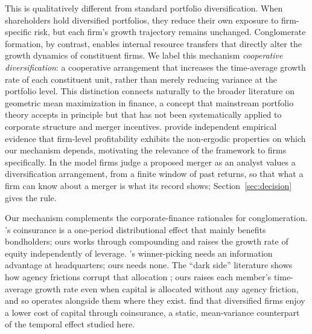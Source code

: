 \documentclass[12pt,a4paper]{article}
\begin{document}
This is qualitatively different from standard portfolio diversification. When shareholders hold diversified portfolios, they reduce their own exposure to firm-specific risk, but each firm's growth trajectory remains unchanged. Conglomerate formation, by contrast, enables internal resource transfers that directly alter the growth dynamics of constituent firms. We label this mechanism \textit{cooperative diversification}: a cooperative arrangement that increases the time-average growth rate of each constituent unit, rather than merely reducing variance at the portfolio level. This distinction connects naturally to the broader literature on geometric mean maximization in finance, a concept that mainstream portfolio theory accepts in principle but that has not been systematically applied to corporate structure and merger incentives. \textcite{mundt2022survival} provide independent empirical evidence that firm-level profitability exhibits the non-ergodic properties on which our mechanism depends, motivating the relevance of the framework to firms specifically. In the model firms judge a proposed merger as an analyst values a diversification arrangement, from a finite window of past returns, so that what a firm can know about a merger is what its record shows; Section~\ref{sec:decision} gives the rule. 

Our mechanism complements the corporate-finance rationales for conglomeration. \textcite{lewellen1971pure}'s coinsurance is a one-period distributional effect that mainly benefits bondholders; ours works through compounding and raises the growth rate of equity independently of leverage. \textcite{stein1997internal}'s winner-picking needs an information advantage at headquarters; ours needs none. The ``dark side'' literature shows how agency frictions corrupt that allocation \parencite{scharfstein2000dark, rajan2000cost}; ours raises each member's time-average growth rate even when capital is allocated without any agency friction, and so operates alongside them where they exist. \textcite{hann2013corporate} find that diversified firms enjoy a lower cost of capital through coinsurance, a static, mean-variance counterpart of the temporal effect studied here. 
\end{document}
